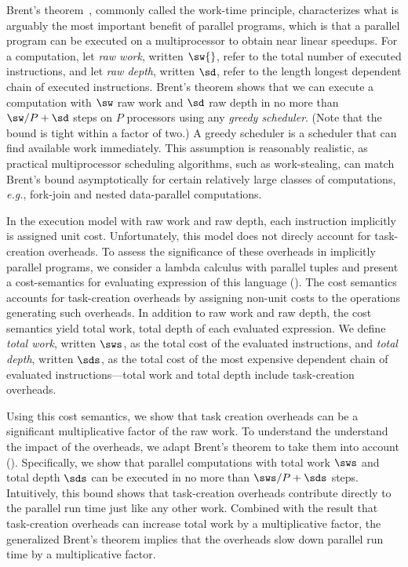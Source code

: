Brent's theorem~\cite{Brent74}, commonly called the work-time
principle, characterizes what is arguably the most important benefit
of parallel programs, which is that a parallel program can be executed
on a multiprocessor to obtain near linear speedups.  For a
computation, let {\em raw work}, written $\sw{}$, refer to the total
number of executed instructions, and let {\em raw depth}, written $\sd$,
refer to the length longest dependent chain of executed instructions.
Brent's theorem shows that we can execute a computation with $\sw$ raw
work and $\sd$ raw depth in no more than $\sw/P + \sd$ steps on $P$
processors using any \emph{greedy scheduler}. (Note that the
  bound is tight within a factor of two.)  A greedy scheduler is a
scheduler that can find available work immediately.  This assumption
is reasonably realistic, as practical multiprocessor scheduling
algorithms, such as work-stealing, can match Brent's bound
asymptotically for certain relatively large classes of computations,
\textit{e.g.}, fork-join and nested data-parallel computations.

In the execution model with raw work and raw depth, each instruction
implicitly is assigned unit cost.  Unfortunately, this model does not
direcly account for task-creation overheads.  To assess the
significance of these overheads in implicitly parallel programs, we
consider a lambda calculus with parallel tuples and present a
cost-semantics for evaluating expression of this language
().  The cost semantics accounts for
task-creation overheads by assigning non-unit costs to the operations
generating such overheads.  In addition to raw work and raw depth, the
cost semantics yield total work, total depth of each evaluated
expression.  We define {\em total work}, written $\sws$, as the total
cost of the evaluated instructions, and {\em total depth}, written
$\sds$, as the total cost of the most expensive dependent chain of
evaluated instructions---total work and total depth include
task-creation overheads.

Using this cost semantics, we show that task creation overheads can be
a significant multiplicative factor of the raw work.  To understand
the understand the impact of the overheads, we adapt Brent's theorem
to take them into account ().  Specifically, we
show that parallel computations with total work $\sws$ and total
depth $\sds$ can be executed in no more than $\sws/P + \sds$ steps.
Intuitively, this bound shows that task-creation overheads contribute
directly to the parallel run time just like any other work.  Combined
with the result that task-creation overheads can increase total work
by a multiplicative factor, the generalized Brent's theorem implies
that the overheads slow down parallel run time by a multiplicative
factor.

